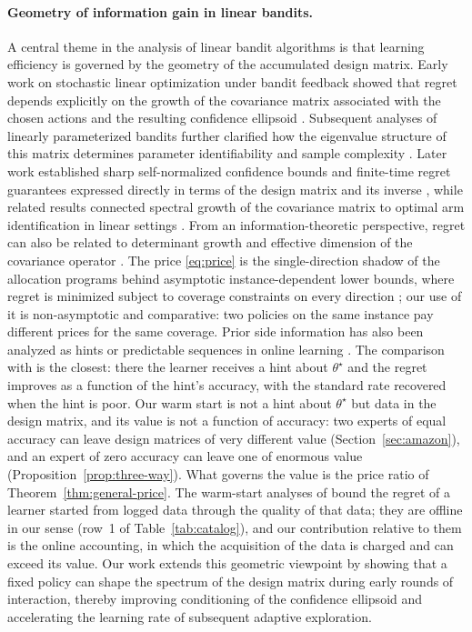 \documentclass{article}
\theoremstyle{definition}
\theoremstyle{remark}
\theoremstyle{remark}
\begin{document}
\paragraph{Geometry of information gain in linear bandits.}
A central theme in the analysis of linear bandit algorithms is that learning
efficiency is governed by the geometry of the accumulated design matrix.
Early work on stochastic linear optimization under bandit feedback showed
that regret depends explicitly on the growth of the covariance matrix
associated with the chosen actions and the resulting confidence ellipsoid
\cite{dani2008stochastic}. Subsequent analyses of linearly parameterized
bandits further clarified how the eigenvalue structure of this matrix
determines parameter identifiability and sample complexity
\cite{rusmevichientong2010linearly}. Later work established sharp
self-normalized confidence bounds and finite-time regret guarantees
expressed directly in terms of the design matrix and its inverse
\cite{abbasi2011improved}, while related results connected spectral growth
of the covariance matrix to optimal arm identification in linear settings
\cite{soare2014best}. From an information-theoretic perspective, regret can
also be related to determinant growth and effective dimension of the
covariance operator \cite{srinivas2012information,valko2013finite}. The
price \eqref{eq:price} is the single-direction shadow of the allocation
programs behind asymptotic instance-dependent lower bounds, where regret is
minimized subject to coverage constraints on every direction
\cite{graves1997asymptotically,lattimore2017end}; our use of it is
non-asymptotic and comparative: two policies on the same instance pay
different prices for the same coverage. Prior side information has also been
analyzed as hints or predictable sequences in online learning
\cite{rakhlin2013online,cutkosky2022leveraging}. The comparison with
\cite{cutkosky2022leveraging} is the closest: there the learner receives a
hint about $\theta^\star$ and the regret improves as a function of the hint's
accuracy, with the standard rate recovered when the hint is poor. Our warm
start is not a hint about $\theta^\star$ but data in the design matrix, and
its value is not a function of accuracy: two experts of equal accuracy can
leave design matrices of very different value (Section~\ref{sec:amazon}),
and an expert of zero accuracy can leave one of enormous value
(Proposition~\ref{prop:three-way}). What governs the value is the price ratio
of Theorem~\ref{thm:general-price}. The warm-start analyses of
\cite{bastani2021mostly,zhang2019warm} bound the regret of a learner started
from logged data through the quality of that data; they are offline in our
sense (row~1 of Table~\ref{tab:catalog}), and our contribution relative to
them is the online accounting, in which the acquisition of the data is
charged and can exceed its value. Our
work extends this geometric viewpoint by showing that a fixed policy can
shape the spectrum of the design matrix during early rounds of interaction,
thereby improving conditioning of the confidence ellipsoid and accelerating
the learning rate of subsequent adaptive exploration.
\end{document}
